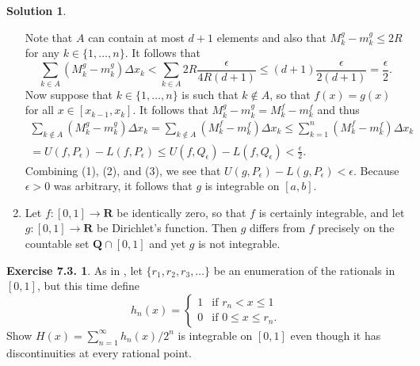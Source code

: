 \documentclass[12pt]{article}
\theoremstyle{definition}
\theoremstyle{exercise}
\newtheorem{exercise}{Exercise 7.3.}
\theoremstyle{solution}
\newtheorem*{solution}{Solution}
\newcommand{\Q}{\mathbf{Q}}
\newcommand{\R}{\mathbf{R}}
\begin{document}
\begin{solution}
\begin{enumerate}
\[        \]
        Note that \( A \) can contain at most \( d + 1 \) elements and also that \( M^g_k - m^g_k \leq 2R \) for any \( k \in \{ 1, \ldots, n \} \). It follows that
        \[
            \sum_{k \in A} (M^g_k - m^g_k) \Delta x_k < \sum_{k \in A} 2R \frac{\epsilon}{4 R (d + 1)} \leq (d + 1) \frac{\epsilon}{2(d + 1)} = \frac{\epsilon}{2}. \tag{2}
        \]
        Now suppose that \( k \in \{ 1, \ldots, n \} \) is such that \( k \not\in A \), so that \( f(x) = g(x) \) for all \( x \in [x_{k-1}, x_k] \). It follows that \( M^g_k - m^g_k = M^f_k - m^f_k \) and thus
        \begin{multline*}
            \sum_{k \not\in A} (M^g_k - m^g_k) \Delta x_k = \sum_{k \not\in A} (M^f_k - m^f_k) \Delta x_k \leq \sum_{k=1}^n (M^f_k - m^f_k) \Delta x_k \\
            = U(f, P_{\epsilon}) - L(f, P_{\epsilon}) \leq U(f, Q_{\epsilon}) - L(f, Q_{\epsilon}) < \frac{\epsilon}{2}. \tag{3}
        \end{multline*}
        Combining (1), (2), and (3), we see that \( U(g, P_{\epsilon}) - L(g, P_{\epsilon}) < \epsilon \). Because \( \epsilon > 0 \) was arbitrary, it follows that \( g \) is integrable on \( [a, b] \).

        \item Let \( f : [0, 1] \to \R \) be identically zero, so that \( f \) is certainly integrable, and let \( g : [0, 1] \to \R \) be Dirichlet's function. Then \( g \) differs from \( f \) precisely on the countable set \( \Q \cap [0, 1] \) and yet \( g \) is not integrable.
    \end{enumerate}
\end{solution}

\begin{exercise}
\label{ex:8}
    As in , let \( \{ r_1, r_2, r_3, \ldots \} \) be an enumeration of the rationals in \( [0, 1] \), but this time define
    \[
        h_n(x) = \begin{cases}
            1 & \text{if } r_n < x \leq 1 \\
            0 & \text{if } 0 \leq x \leq r_n.
        \end{cases}
    \]
    Show \( H(x) = \sum_{n=1}^{\infty} h_n(x) / 2^n \) is integrable on \( [0, 1] \) even though it has discontinuities at every rational point.
\end{exercise}
\end{document}
